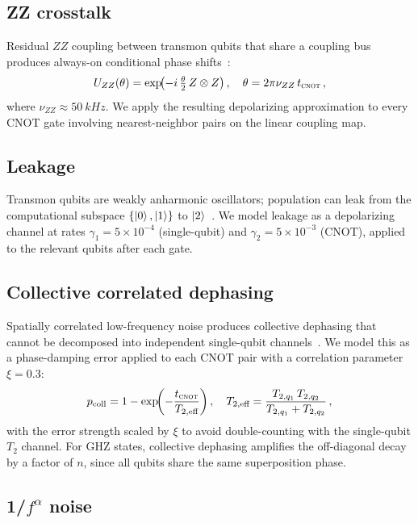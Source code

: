 \documentclass[aip, amsmath, amssymb, preprint, longbibliography]{revtex4-2}
\newcommand{\cnot}{\textsc{cnot}}
\begin{document}
\subsection{ZZ crosstalk}\label{sec:crosstalk}

Residual $ZZ$ coupling between transmon qubits that share a coupling
bus produces always-on conditional phase
shifts~\cite{Mundada2019,Malekakhlagh2020}:
\begin{equation}
U_{ZZ}(\theta) = \exp\!\bigl(-i\,\tfrac{\theta}{2}\,Z\otimes Z\bigr)\,,
\quad \theta = 2\pi\nu_{ZZ}\,t_{\cnot}\,,
\label{eq:zz}
\end{equation}
where $\nu_{ZZ}\approx\SI{50}{kHz}$. We apply the resulting depolarizing
approximation to every CNOT gate involving nearest-neighbor pairs on the
linear coupling map.

\subsection{Leakage}\label{sec:leakage}

Transmon qubits are weakly anharmonic oscillators; population can leak
from the computational subspace $\{\ket{0},\ket{1}\}$ to
$\ket{2}$~\cite{Rol2019,Wood2018}. We model leakage as a depolarizing
channel at rates $\gamma_1=5\times10^{-4}$ (single-qubit) and
$\gamma_2=5\times10^{-3}$ (CNOT), applied to the relevant qubits after
each gate.

\subsection{Collective correlated dephasing}\label{sec:collective}

Spatially correlated low-frequency noise produces collective dephasing
that cannot be decomposed into independent single-qubit
channels~\cite{Clemens2004,Chirolli2008}. We model this as a
phase-damping error applied to each CNOT pair with a correlation
parameter $\xi=0.3$:
\begin{equation}
p_{\text{coll}} = 1-\exp\!\biggl(-\frac{t_{\cnot}}{T_{2,\text{eff}}}\biggr)\,,
\quad T_{2,\text{eff}} = \frac{T_{2,q_1}\,T_{2,q_2}}{T_{2,q_1}+T_{2,q_2}}\,,
\label{eq:collective}
\end{equation}
with the error strength scaled by $\xi$ to avoid double-counting with the
single-qubit $T_2$ channel. For GHZ states, collective dephasing
amplifies the off-diagonal decay by a factor of $n$, since all qubits
share the same superposition phase.

\subsection{1/$f^\alpha$ noise}\label{sec:onef}
\end{document}
